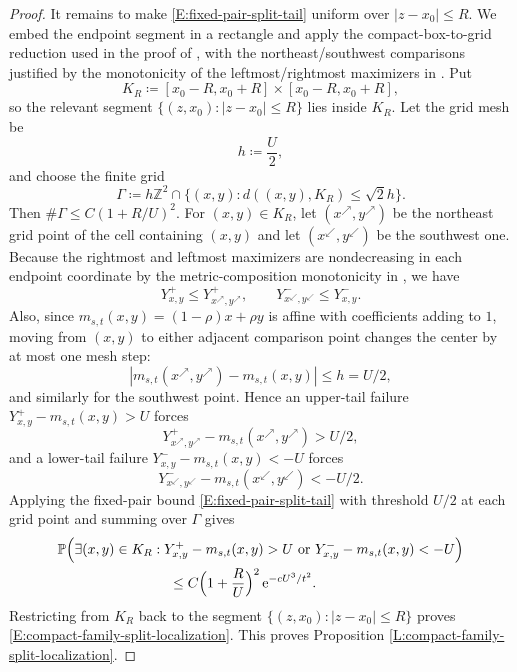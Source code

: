\documentclass[12pt, reqno]{amsart}
\numberwithin{equation}{section}
\theoremstyle{definition}
\newcommand{\Prob}{\mathbb{P}}
\newcommand{\e}{\,\mathrm{e}}
\begin{document}
\begin{proof}
  It remains to make \eqref{E:fixed-pair-split-tail} uniform over $|z-x_0| \le
  R$. We embed the endpoint segment in a rectangle and apply the
  compact-box-to-grid reduction used in the proof of
  \cite[Lemma~12.2]{dauvergne.ortmann.ea:22:directed}, with the
  northeast/southwest comparisons justified by the monotonicity of the
  leftmost/rightmost maximizers in
  \cite[Proposition~9.2]{dauvergne.ortmann.ea:22:directed}.  Put
  \[
    K_R \coloneqq [x_0-R,x_0+R]\times[x_0-R,x_0+R],
  \]
  so the relevant segment $\{(z,x_0):|z-x_0|\le R\}$ lies inside $K_R$.  Let the
  grid mesh be
  \[
    h \coloneqq \frac{U}{2},
  \]
  and choose the finite grid
  \[
    \Gamma \coloneqq h\mathbb{Z}^2\cap
    \{(x,y): d((x,y),K_R)\le \sqrt{2}h\}.
  \]
  Then $\#\Gamma\le C(1+R/U)^2$.  For $(x,y)\in K_R$, let
  $(x^{\nearrow},y^{\nearrow})$ be the northeast grid point of the cell
  containing $(x,y)$ and let $(x^{\swarrow},y^{\swarrow})$ be the southwest one.
  Because the rightmost and leftmost maximizers are nondecreasing in each
  endpoint coordinate by the metric-composition monotonicity in
  \cite[Proposition~9.2]{dauvergne.ortmann.ea:22:directed}, we have
  \[
    Y^+_{x,y}\le Y^+_{x^{\nearrow},y^{\nearrow}},
    \qquad
    Y^-_{x^{\swarrow},y^{\swarrow}}\le Y^-_{x,y}.
  \]
  Also, since $m_{s,t}(x,y)=(1-\rho)x+\rho y$ is affine with coefficients adding
  to $1$, moving from $(x,y)$ to either adjacent comparison point changes the
  center by at most one mesh step:
  \[
    |m_{s,t}(x^{\nearrow},y^{\nearrow})-m_{s,t}(x,y)|\le h=U/2,
  \]
  and similarly for the southwest point.  Hence an upper-tail failure
  $Y^+_{x,y}-m_{s,t}(x,y)>U$ forces
  \[
    Y^+_{x^{\nearrow},y^{\nearrow}}-m_{s,t}(x^{\nearrow},y^{\nearrow})>U/2,
  \]
  and a lower-tail failure $Y^-_{x,y}-m_{s,t}(x,y)<-U$ forces
  \[
    Y^-_{x^{\swarrow},y^{\swarrow}}-m_{s,t}(x^{\swarrow},y^{\swarrow})<-U/2.
  \]
  Applying the fixed-pair bound \eqref{E:fixed-pair-split-tail} with threshold
  $U/2$ at each grid point and summing over $\Gamma$ gives
  \begin{align*}
    &\Prob\Big(
    \exists (x,y)\in K_R:
    Y^+_{x,y}-m_{s,t}(x,y)>U
    \text{ or }
    Y^-_{x,y}-m_{s,t}(x,y)<-U
    \Big)\\
    &\qquad\qquad\qquad \qquad 
    \le C\Bigl(1+\frac{R}{U}\Bigr)^2 \e^{-cU^3/t^2}.
  \end{align*}
  Restricting from $K_R$ back to the segment $\{(z,x_0):|z-x_0|\le R\}$ proves
  \eqref{E:compact-family-split-localization}. This proves Proposition
  \ref{L:compact-family-split-localization}.
\end{proof}
  
\end{document}
